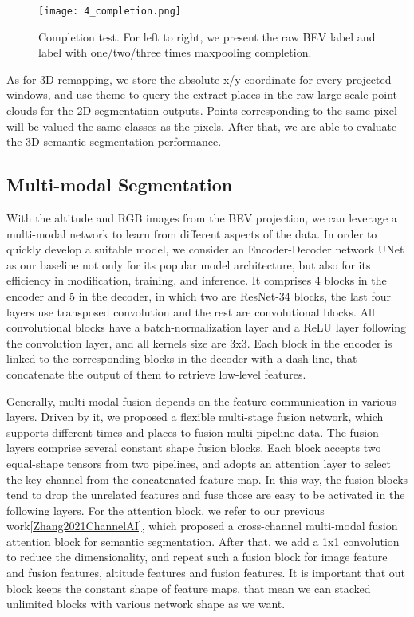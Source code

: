 \documentclass[conference]{IEEEtran}
\begin{document}
\begin{figure}[htb!]
\centering
\texttt{[image: 4\_completion.png]}
\caption{Completion test. For left to right, we present the raw BEV label and label with one/two/three times maxpooling completion.}
\label{completion}
\end{figure}

As for 3D remapping, we store the absolute x/y coordinate for every projected windows, and use theme to query the extract places in the raw large-scale point clouds for the 2D segmentation outputs. Points corresponding to the same pixel will be valued the same classes as the pixels. After that, we are able to evaluate the 3D semantic segmentation performance.

\subsection{Multi-modal Segmentation}
With the altitude and RGB images from the BEV projection, we can leverage a multi-modal network to learn from different aspects of the data. In order to quickly develop a suitable model, we consider an Encoder-Decoder network UNet as our baseline not only for its popular model architecture, but also for its efficiency in modification, training, and inference. It comprises 4 blocks in the encoder and 5 in the decoder, in which two are ResNet-34 blocks, the last four layers use transposed convolution and the rest are convolutional blocks. All convolutional blocks have a batch-normalization layer and a ReLU layer following the convolution layer, and all kernels size are 3x3. Each block in the encoder is linked to the corresponding blocks in the decoder with a dash line, that concatenate the output of them to retrieve low-level features.

Generally, multi-modal fusion depends on the feature communication in various layers. Driven by it, we proposed a flexible multi-stage fusion network, which supports different times and places to fusion multi-pipeline data. The fusion layers comprise several constant shape fusion blocks. Each block accepts two equal-shape tensors from two pipelines, and adopts an attention layer to select the key channel from the concatenated feature map. In this way, the fusion blocks tend to drop the unrelated features and fuse those are easy to be activated in the following layers. For the attention block, we refer to our previous work\ref{Zhang2021ChannelAI}, which proposed a cross-channel multi-modal fusion attention block for semantic segmentation. After that, we add a 1x1 convolution to reduce the dimensionality, and repeat such a fusion block for image feature and fusion features, altitude features and fusion features. It is important that out block keeps the constant shape of feature maps, that mean we can stacked unlimited blocks with various network shape as we want.
\end{document}
